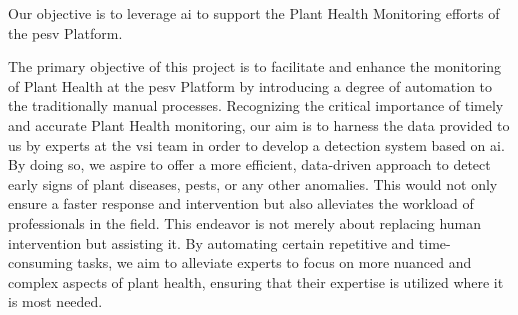 \label{01_thesis_objectives}


 Our objective is to leverage \gls{ai} to support the Plant Health Monitoring efforts of the \gls{pesv} Platform.


 The primary objective of this project is to facilitate and enhance the monitoring of Plant Health at the \gls{pesv} Platform by introducing a degree of automation to the traditionally manual processes. 
 Recognizing the critical importance of timely and accurate Plant Health monitoring, our aim is to harness the data provided to us by experts at the \gls{vsi} team in order to develop a detection system based on \gls{ai}. By doing so, we aspire to offer a more efficient, data-driven approach to detect early signs of plant diseases, pests, or any other anomalies. 
 This would not only ensure a faster response and intervention but also alleviates the workload of professionals in the field. This endeavor is not merely about replacing human intervention but assisting it. By automating certain repetitive and time-consuming tasks, we aim to alleviate experts to focus on more nuanced and complex aspects of plant health, ensuring that their expertise is utilized where it is most needed.

  